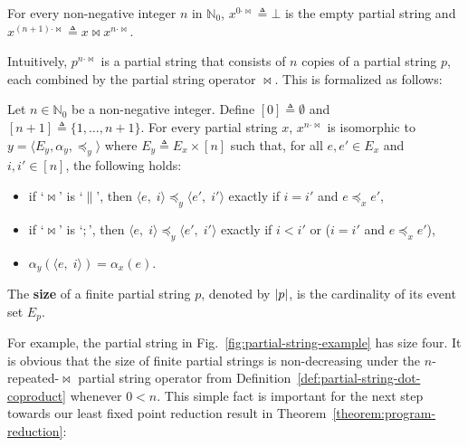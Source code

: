 \documentclass{llncs}
\newcommand{\pair}[2]{\mbox{$\langle #1,\; #2 \rangle$}}
\newcommand{\tuple}[1]{\mbox{$\langle #1 \rangle$}}
\newcommand{\set}[1]{\mbox{$\{ #1 \}$}}
\newcommand{\deq}{\triangleq}
\newcommand{\nats}{\mathbb{N}}
\newcommand{\defn}[1]{\textbf{#1}}
\DeclarePairedDelimiter\abs{\lvert}{\rvert}
\begin{document}
\begin{definition}
\label{def:partial-string-dot-coproduct}
For every non-negative integer $n$ in $\nats_0$, $x^{0 \cdot \Join} \deq \bot$ is the empty partial string and $x^{(n+1) \cdot \Join} \deq x \Join x^{n \cdot \Join}$.
\end{definition}

Intuitively, $p^{n \cdot \Join}$ is a partial string that consists of $n$ copies of a partial string $p$, each combined by the partial string operator $\Join$. This is formalized as follows:

\begin{proposition}
Let $n \in \nats_0$ be a non-negative integer. Define $[0] \deq \emptyset$ and $[n + 1] \deq \set{1, \ldots, n + 1}$. For every partial string $x$, $x^{n \cdot \Join}$ is isomorphic to $y = \tuple{E_y, \alpha_y, \preceq_y}$ where $E_y \deq E_x \times [n]$ such that, for all $e, e' \in E_x$ and $i, i' \in [n]$, the following holds:
\begin{itemize}
\item if `$\Join$' is `$\parallel$', then $\pair{e}{i} \preceq_y \pair{e'}{i'}$ exactly if $i = i'$ and $e \preceq_x e'$,
\item if `$\Join$' is `$;$', then $\pair{e}{i} \preceq_y \pair{e'}{i'}$ exactly if $i < i'$ or ($i = i'$ and $e \preceq_x e'$),
\item $\alpha_y(\pair{e}{i}) = \alpha_x(e)$.
\end{itemize}
\end{proposition}

\begin{definition}
\label{def:partial-string-size}
The \defn{size} of a finite partial string $p$, denoted by $\abs{p}$, is the cardinality of its event set $E_p$.
\end{definition}

For example, the partial string in Fig.~\ref{fig:partial-string-example} has size four. It is obvious that the size of finite partial strings is non-decreasing under the $n$-repeated-$\Join$ partial string operator from Definition~\ref{def:partial-string-dot-coproduct} whenever $0 < n$. This simple fact is important for the next step towards our least fixed point reduction result in Theorem~\ref{theorem:program-reduction}:
\end{document}
